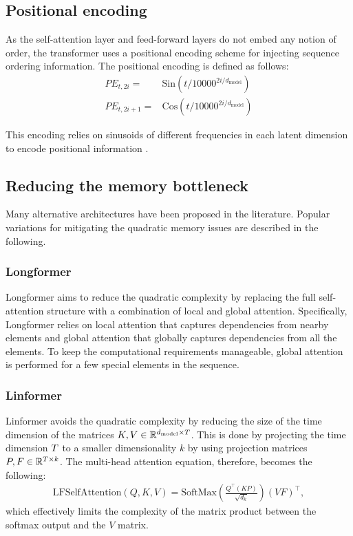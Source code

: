 \documentclass[lettersize,journal]{IEEEtran}
\begin{document}
\subsection{Positional encoding}
As the self-attention layer and feed-forward layers do not embed any notion of order, the transformer uses a positional encoding scheme for injecting sequence ordering information. The positional encoding is defined as follows:
\begin{align}
    PE_{t, 2i} =& \text{Sin}(t / 10000^{2i/d_\text{model}}) \\
    PE_{t, 2i+1} =& \text{Cos}(t / 10000^{2i/d_\text{model}})
\end{align}

This encoding relies on sinusoids of different frequencies in each latent dimension to encode positional information \cite{vaswani2017}. 







\subsection{Reducing the memory bottleneck}
\label{sec:efficient-self-attention}
Many alternative architectures have been proposed in the literature. Popular variations for mitigating the quadratic memory issues are described in the following.


\subsubsection{Longformer} 

Longformer \cite{beltagy2020longformer} aims to reduce the quadratic complexity by replacing the full self-attention structure with a combination of local and global attention. 
Specifically, Longformer relies on local attention that captures dependencies from nearby elements and global attention that globally captures dependencies from all the elements. To keep the computational requirements manageable, global attention is performed for a few special elements in the sequence.



\subsubsection{Linformer}
Linformer \cite{wang2020linformer} avoids the quadratic complexity by reducing the size of the time dimension of the matrices $K, V \in \mathbb R^{d_\text{model} \times T}$. This is done by projecting the time dimension $T$ to a smaller dimensionality $k$ by using projection matrices $P, F \in \mathbb R^{T \times k}$. The multi-head attention equation, therefore, becomes the following: 
\begin{align}
    \text{LFSelfAttention}\left (Q, K, V \right ) = \text{SoftMax}\left (\frac{Q^\top (K P)}{\sqrt{d_k}} \right) (V F)^\top,
\end{align}
which effectively limits the complexity of the matrix product between the softmax output and the $V$ matrix. 
\end{document}
